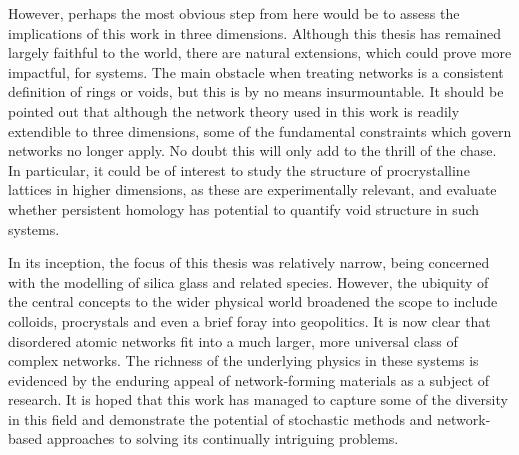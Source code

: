 However, perhaps the most obvious step from here would be to assess the implications of this work in three dimensions.
Although this thesis has remained largely faithful to the \td{} world, there are natural extensions, which could prove more impactful, for \thd{} systems.
The main obstacle when treating \thd{} networks is a consistent definition of rings or voids, but this is by no means insurmountable. 
It should be pointed out that although the network theory used in this work is readily extendible to three dimensions, some of the fundamental constraints which govern \td{} networks no longer apply.
No doubt this will only add to the thrill of the chase.
In particular, it could be of interest to study the structure of procrystalline lattices in higher dimensions, as these are experimentally relevant, and evaluate whether persistent homology has potential to quantify void structure in such systems.

In its inception, the focus of this thesis was relatively narrow, being concerned with the modelling of \td{} silica glass and related species.
However, the ubiquity of the central concepts to the wider physical world broadened the scope to include colloids, procrystals and even a brief foray into geopolitics.
It is now clear that disordered \td{} atomic networks fit into a much larger, more universal class of complex networks. %
The richness of the underlying physics in these systems is evidenced by the enduring appeal of network\--forming materials as a subject of research.
It is hoped that this work has managed to capture some of the diversity in this field and demonstrate the potential of stochastic methods and network\--based approaches to solving its continually intriguing problems.




